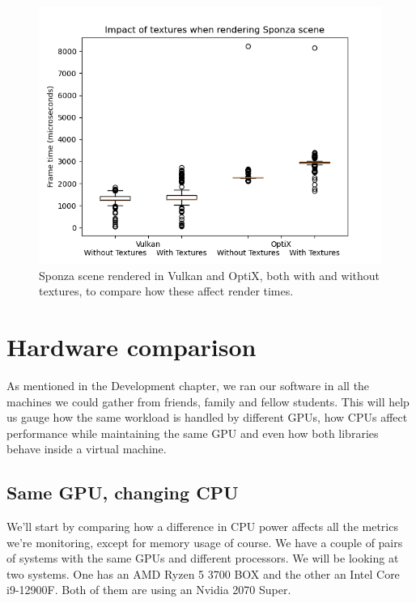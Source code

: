 \begin{figure}[hbt!]
    \centering
    \includegraphics[width=1.0\textwidth]{figuras/texture-impact.png}
    \caption{Sponza scene rendered in Vulkan and OptiX, both with and without textures, to compare how these affect render times.}
    \label{texture-impact-graph}
\end{figure}
\clearpage
\section{Hardware comparison}
As mentioned in the Development chapter, we ran our software in all the machines we could gather from friends, family and fellow students. This will help us gauge how the same workload is handled by different GPUs, how CPUs affect performance while maintaining the same GPU and even how both libraries behave inside a virtual machine.

\subsection{Same GPU, changing CPU}
We'll start by comparing how a difference in CPU power affects all the metrics we're monitoring, except for memory usage of course. We have a couple of pairs of systems with the same GPUs and different processors. We will be looking at two systems. One has an AMD Ryzen 5 3700 BOX and the other an Intel Core i9-12900F. Both of them are using an Nvidia 2070 Super. %

